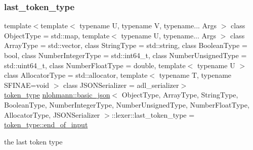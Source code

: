 \subsubsection{\texorpdfstring{last\+\_\+token\+\_\+type}{last\_token\_type}}
{\footnotesize\ttfamily template$<$template$<$ typename U, typename V, typename... Args $>$ class Object\+Type = std\+::map, template$<$ typename U, typename... Args $>$ class Array\+Type = std\+::vector, class String\+Type  = std\+::string, class Boolean\+Type  = bool, class Number\+Integer\+Type  = std\+::int64\+\_\+t, class Number\+Unsigned\+Type  = std\+::uint64\+\_\+t, class Number\+Float\+Type  = double, template$<$ typename U $>$ class Allocator\+Type = std\+::allocator, template$<$ typename T, typename S\+F\+I\+N\+A\+E=void $>$ class J\+S\+O\+N\+Serializer = adl\+\_\+serializer$>$ \\
\hyperlink{classnlohmann_1_1basic__json_1_1lexer_a96887d6cd131e3d3a85a9d71fbdbcdf7}{token\+\_\+type} \hyperlink{classnlohmann_1_1basic__json}{nlohmann\+::basic\+\_\+json}$<$ Object\+Type, Array\+Type, String\+Type, Boolean\+Type, Number\+Integer\+Type, Number\+Unsigned\+Type, Number\+Float\+Type, Allocator\+Type, J\+S\+O\+N\+Serializer $>$\+::lexer\+::last\+\_\+token\+\_\+type = \hyperlink{classnlohmann_1_1basic__json_1_1lexer_a96887d6cd131e3d3a85a9d71fbdbcdf7aca11f56dd477c09e06583dbdcda0985f}{token\+\_\+type\+::end\+\_\+of\+\_\+input}\hspace{0.3cm}{\ttfamily [private]}}



the last token type 

\mbox{\label{classnlohmann_1_1basic__json_1_1lexer_a3fdf69ff3f266c23ee351cde2ce44ad6}} 

